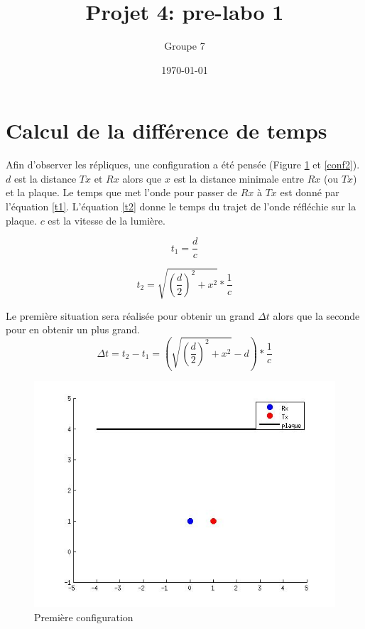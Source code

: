 \documentclass[10pt,a4paper]{article}
\begin{document}
\title{Projet 4: pre-labo 1}
\date\today
\author{Groupe 7}
\maketitle

\section{Calcul de la différence de temps}
	Afin d'observer les répliques, une configuration a été pensée (Figure \ref{conf1} et \ref{conf2}). $d$ est la distance $Tx$ et $Rx$ alors que $x$ est la distance minimale entre $Rx$ (ou $Tx$) et la plaque. Le temps que met l'onde pour passer de $Rx$ à $Tx$ est donné par l'équation \ref{t1}. L'équation \ref{t2} donne le temps du trajet de l'onde réfléchie sur la plaque. $c$ est la vitesse de la lumière. 	

	\begin{equation}
	t_1 = \frac{d}{c}
	\label{t1}
	\end{equation}
	
	\begin{equation}
	t_2 = \sqrt{(\frac{d}{2})^2 + x^2} * \frac{1}{c}
	\label{t2}
	\end{equation}
	
	Le première situation sera réalisée pour obtenir un grand $\Delta t$ alors que la seconde pour en obtenir un plus grand.
	\begin{equation}
	\Delta t = t_2 - t_1 = (\sqrt{(\frac{d}{2})^2 + x^2} - d ) * \frac{1}{c}
	\end{equation}
	
	\begin{figure}[h]
	\centering
	\includegraphics[scale=0.4]{conf1.jpg}
	\caption{Première configuration \label{conf1} }
	\end{figure}		
	
\end{document}
